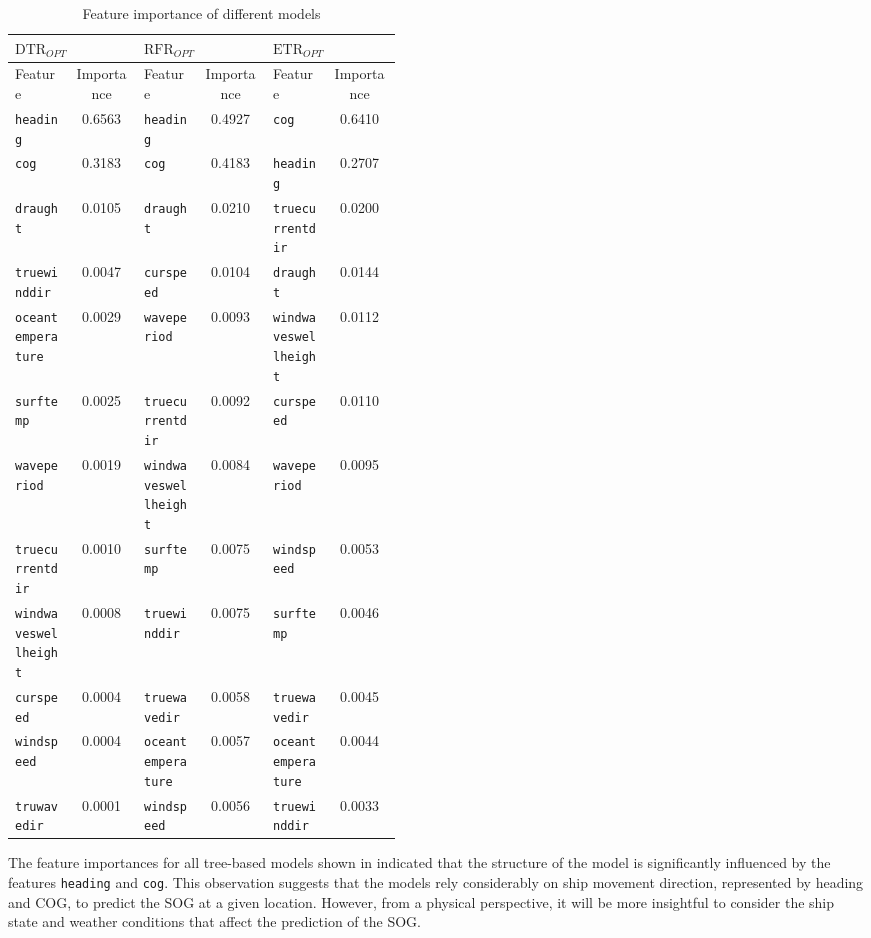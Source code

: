 \begin{table}[h]
    \scriptsize
    \centering
    \resizebox {\textwidth}{!}
    {\begin{tabular}{ p{0.15\linewidth} c| p{0.15\linewidth} c| p{0.15\linewidth} c}
    \hline
    $\text{DTR}_{OPT}$ & & $\text{RFR}_{OPT}$ & & $\text{ETR}_{OPT}$\\
    \hline
    Feature & Importance & Feature & Importance & Feature & Importance\\
    \hline
    {\tt heading} & 0.6563 & {\tt heading} & 0.4927 & {\tt cog} & 0.6410 \\
    {\tt cog} & 0.3183 & {\tt cog} & 0.4183 & {\tt heading} & 0.2707 \\
    {\tt draught} & 0.0105 & {\tt draught} & 0.0210 & {\tt truecurrentdir} & 0.0200\\
    {\tt truewinddir} & 0.0047 & {\tt curspeed} & 0.0104 & {\tt draught} & 0.0144 \\
    {\tt oceantemperature} & 0.0029 & {\tt waveperiod} & 0.0093& {\tt windwaveswellheight} & 0.0112\\
    {\tt surftemp} & 0.0025&{\tt truecurrentdir} & 0.0092 & {\tt curspeed} & 0.0110\\
    {\tt waveperiod} & 0.0019 & {\tt windwaveswellheight} & 0.0084& {\tt waveperiod} & 0.0095 \\
    {\tt truecurrentdir} & 0.0010 & {\tt surftemp} & 0.0075& {\tt windspeed} & 0.0053\\
    {\tt windwaveswellheight} & 0.0008 & {\tt truewinddir} & 0.0075& {\tt surftemp} & 0.0046 \\
    {\tt curspeed} & 0.0004 & {\tt truewavedir} & 0.0058& {\tt truewavedir} & 0.0045 \\
    {\tt windspeed} & 0.0004 & {\tt oceantemperature} & 0.0057& {\tt oceantemperature} & 0.0044\\
    {\tt truwavedir} & 0.0001 & {\tt windspeed} & 0.0056& {\tt truewinddir} & 0.0033\\
    \end{tabular}}
\caption{Feature importance of different models}\label{tbl:feature_importances}
\end{table}

The feature importances for all tree-based models shown in  indicated that the structure of the model is significantly influenced by the features {\tt heading} and {\tt cog}. This observation suggests that the models rely considerably on ship movement direction, represented by heading and COG, to predict the SOG at a given location. However, from a physical perspective, it will be more insightful to consider the ship state and weather conditions that affect the prediction of the SOG.\\

